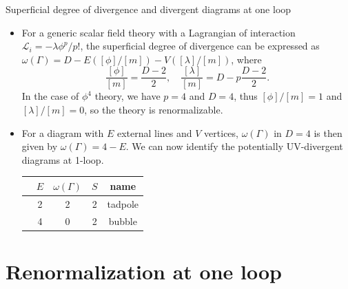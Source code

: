 \documentclass[aspectratio=169,10pt]{beamer}
\newcommand{\Lag}{\mathcal{L}}
\newcommand{\TadpoleDiagram}{%
\begin{tikzpicture}[scale=0.6, transform shape, baseline={([yshift=-0.4cm]current bounding box.center)}]
    \begin{feynman}
        \vertex (i) at (-1.5,0);
        \vertex [dot] (v) at (0,0) {};
        \vertex (f) at (1.5,0);

        \diagram*{(i) -- [scalar] (v) -- [scalar] (f)};

        \draw (v) edge[scalar, loop above, out=140, in=40, min distance=2cm, looseness=4] (v);

    \end{feynman}
\end{tikzpicture}%
}
\newcommand{\BubbleDiagram}[1]{%
\begin{tikzpicture}[scale=0.6, transform shape, baseline={([yshift=-0.1cm]current bounding box.center)}]
\begin{feynman}
    \vertex (i1) at (-1.5,0.8);
    \vertex (i2) at (-1.5,-0.8);
    \vertex [dot] (v1) at (-0.45,0) {};
    \vertex [dot] (v2) at (0.45,0) {};
    \vertex (f1) at (1.5,0.8);
    \vertex (f2) at (1.5,-0.8);

    \diagram*{
        (i1) -- [scalar] (v1),
        (i2) -- [scalar] (v1),
        (v1) -- [scalar, half left, looseness=1.5] (v2),
        (v1) -- [scalar, half right, looseness=1.5] (v2),
        (v2) -- [scalar] (f1),
        (v2) -- [scalar] (f2)
    };
\end{feynman}
\node at (0,-0.8) {$#1$};
\end{tikzpicture}%
}
\begin{document}
\begin{frame}{Superficial degree of divergence and divergent diagrams at one loop}
    \begin{itemize}
        \item For a generic scalar field theory with a Lagrangian of interaction $\Lag_i = -\lambda \phi^p/p!$, the superficial degree of divergence can be expressed as $\omega(\Gamma) = D - E([\phi]/[m]) - V([\lambda]/[m])$, where
    \begin{equation}
        \frac{[\phi]}{[m]} = \frac{D - 2}{2},\quad \frac{[\lambda]}{[m]} = D - p\frac{D - 2}{2}.
    \end{equation}
    In the case of $\phi^4$ theory, we have $p = 4$ and $D = 4$, thus $[\phi]/[m] = 1$ and $[\lambda]/[m] = 0$, so the theory is renormalizable. 
    \item For a diagram with $E$ external lines and $V$ vertices, $\omega(\Gamma)$ in $D = 4$ is then given by $\omega(\Gamma) = 4 - E$. We can now identify the potentially UV-divergent diagrams at 1-loop.
    \begin{table}[]
        \centering
        \begin{tabular}{|c|c|c|c|c|}
            \hline
             & $E$ & $\omega(\Gamma)$ & $S$ & name \\
             \hline
             \TadpoleDiagram & 2 & 2 & 2 & tadpole \\
             \BubbleDiagram{} & 4 & 0 & 2 & bubble \\
             \hline
        \end{tabular}
        \label{tab: divergent diagrams}
    \end{table}
    \end{itemize}
\end{frame}

\section{Renormalization at one loop}
\end{document}

